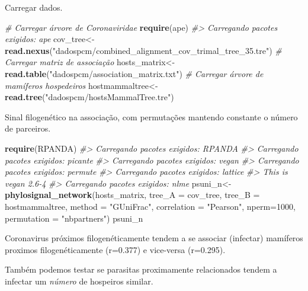 \documentclass[
]{book}
\newenvironment{Shaded}{\begin{snugshade}}{\end{snugshade}}
\newcommand{\AttributeTok}[1]{\textcolor[rgb]{0.13,0.29,0.53}{#1}}
\newcommand{\CommentTok}[1]{\textcolor[rgb]{0.56,0.35,0.01}{\textit{#1}}}
\newcommand{\DecValTok}[1]{\textcolor[rgb]{0.00,0.00,0.81}{#1}}
\newcommand{\FunctionTok}[1]{\textcolor[rgb]{0.13,0.29,0.53}{\textbf{#1}}}
\newcommand{\NormalTok}[1]{#1}
\newcommand{\OtherTok}[1]{\textcolor[rgb]{0.56,0.35,0.01}{#1}}
\newcommand{\StringTok}[1]{\textcolor[rgb]{0.31,0.60,0.02}{#1}}
\begin{document}
Carregar dados.

\begin{Shaded}
\begin{Highlighting}[]
\CommentTok{\# Carregar árvore de Coronaviridae}
\FunctionTok{require}\NormalTok{(ape)}
\CommentTok{\#\textgreater{} Carregando pacotes exigidos: ape}
\NormalTok{cov\_tree}\OtherTok{\textless{}{-}}\FunctionTok{read.nexus}\NormalTok{(}\StringTok{"dadospcm/combined\_alignment\_cov\_trimal\_tree\_35.tre"}\NormalTok{)}
\CommentTok{\# Carregar matriz de associação}
\NormalTok{hosts\_matrix}\OtherTok{\textless{}{-}}\FunctionTok{read.table}\NormalTok{(}\StringTok{"dadospcm/association\_matrix.txt"}\NormalTok{)}
\CommentTok{\# Carregar árvore de mamíferos hospedeiros}
\NormalTok{hostmammaltree}\OtherTok{\textless{}{-}}\FunctionTok{read.tree}\NormalTok{(}\StringTok{"dadospcm/hostsMammalTree.tre"}\NormalTok{)}
\end{Highlighting}
\end{Shaded}

Sinal filogenético na associação, com permutações mantendo constante o número de parceiros.

\begin{Shaded}
\begin{Highlighting}[]
\FunctionTok{require}\NormalTok{(RPANDA)}
\CommentTok{\#\textgreater{} Carregando pacotes exigidos: RPANDA}
\CommentTok{\#\textgreater{} Carregando pacotes exigidos: picante}
\CommentTok{\#\textgreater{} Carregando pacotes exigidos: vegan}
\CommentTok{\#\textgreater{} Carregando pacotes exigidos: permute}
\CommentTok{\#\textgreater{} Carregando pacotes exigidos: lattice}
\CommentTok{\#\textgreater{} This is vegan 2.6{-}4}
\CommentTok{\#\textgreater{} Carregando pacotes exigidos: nlme}
\NormalTok{psuni\_n}\OtherTok{\textless{}{-}}\FunctionTok{phylosignal\_network}\NormalTok{(hosts\_matrix, }\AttributeTok{tree\_A =}\NormalTok{ cov\_tree, }
 \AttributeTok{tree\_B =}\NormalTok{ hostmammaltree, }
 \AttributeTok{method =} \StringTok{"GUniFrac"}\NormalTok{, }
 \AttributeTok{correlation =} \StringTok{"Pearson"}\NormalTok{, }
 \AttributeTok{nperm=}\DecValTok{1000}\NormalTok{, }\AttributeTok{permutation =} \StringTok{"nbpartners"}\NormalTok{)}
\NormalTok{psuni\_n}
\end{Highlighting}
\end{Shaded}

Coronavirus próximos filogenéticamente tendem a se associar (infectar) mamíferos proximos filogenéticamente (r=0.377) e vice-versa (r=0.295).

Também podemos testar se parasitas proximamente relacionados tendem a infectar um \emph{número} de hospeiros similar.
\end{document}

